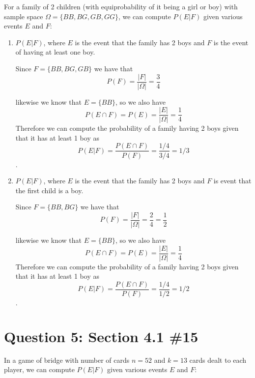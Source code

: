 \documentclass[11pt, oneside]{article}   	%
\begin{document}
For a family of 2 children (with equiprobability of it being a girl or boy) with sample space $\Omega = \{BB, BG, GB, GG\}$, we can compute $P(E | F)$ given various events $E$ and $F$:

\begin{enumerate}[\quad (a)]
	\item $P(E | F)$, where $E$ is the event that the family has 2 boys and $F$ is the event of having at least one boy.
	
	Since  $F = \{BB, BG, GB\}$ we have that 
	$$P(F) = \frac{|F|}{|\Omega|} = \frac{3}{4}$$
	
	likewise we know that $E=\{BB\}$, so we also have
	$$P(E \cap F) = P(E) = \frac{|E|}{|\Omega|} = \frac{1}{4}$$
	Therefore we can compute the probability of a family having 2 boys given that it has at least 1 boy as
	$$P(E | F) = \frac{P(E \cap F)}{P(F)} = \frac{1/4}{3/4} = 1/3$$.
	
	\item $P(E | F)$, where $E$ is the event that the family has 2 boys and $F$ is event that the first child is a boy.
	
	Since  $F = \{BB, BG\}$ we have that 
	$$P(F) = \frac{|F|}{|\Omega|} = \frac{2}{4} = \frac{1}{2}$$
	
	likewise we know that $E=\{BB\}$, so we also have
	$$P(E \cap F) = P(E) = \frac{|E|}{|\Omega|} = \frac{1}{4}$$
	Therefore we can compute the probability of a family having 2 boys given that it has at least 1 boy as
	$$P(E | F) = \frac{P(E \cap F)}{P(F)} = \frac{1/4}{1/2} = 1/2$$.	
\end{enumerate}

\section*{Question 5: Section 4.1 \#15}

In a game of bridge with number of cards $n=52$ and $k=13$ cards dealt to each player, we can compute $P(E | F)$ given various events $E$ and $F$:
\end{document}
